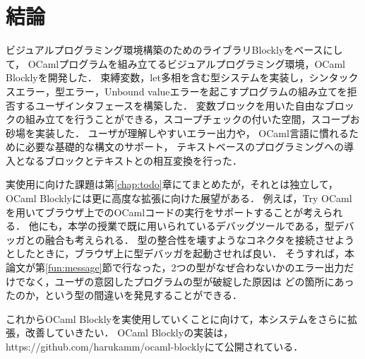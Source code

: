 \chapter {結論}\label{chap:conclusion}

ビジュアルプログラミング環境構築のためのライブラリBlocklyをベースにして，
OCamlプログラムを組み立てるビジュアルプログラミング環境，OCaml Blocklyを開発した．
束縛変数，let多相を含む型システムを実装し，シンタックスエラー，型エラー，Unbound valueエラーを起こすプログラムの組み立てを拒否するユーザインタフェースを構築した．
変数ブロックを用いた自由なブロックの組み立てを行うことができる，スコープチェックの付いた空間，スコープお砂場を実装した．
ユーザが理解しやすいエラー出力や，
OCaml言語に慣れるために必要な基礎的な構文のサポート，
テキストベースのプログラミングへの導入となるブロックとテキストとの相互変換を行った．

実使用に向けた課題は第\ref{chap:todo}章にてまとめたが，それとは独立して，OCaml Blocklyには更に高度な拡張に向けた展望がある．
例えば，Try OCamlを用いてブラウザ上でのOCamlコードの実行をサポートすることが考えられる．
他にも，本学の授業で既に用いられているデバッグツールである，型デバッガ\cite{10.1007/978-3-642-41582-1_12}との融合も考えられる．
型の整合性を壊すようなコネクタを接続させようとしたときに，ブラウザ上に型デバッガを起動させれば良い．
そうすれば，本論文が第\ref{fun:message}節で行なった，2つの型がなぜ合わないかのエラー出力だけでなく，ユーザの意図したプログラムの型が破綻した原因は
どの箇所にあったのか，という型の間違いを発見することができる．

これからOCaml Blocklyを実使用していくことに向けて，本システムをさらに拡張，改善していきたい．
OCaml Blocklyの実装は，https://github.com/harukamm/ocaml-blocklyにて公開されている．

